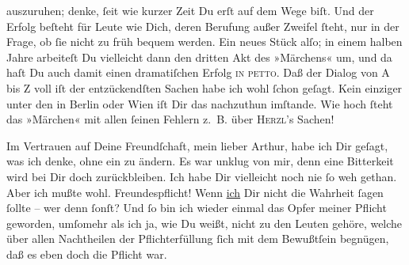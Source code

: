                auszuruhen; denke, ſeit wie kurzer Zeit Du erſt auf dem Wege biſt. Und der Erfolg
               beſteht für Leute wie Dich, deren Berufung außer Zweifel ſteht, nur in der Frage, ob
               ſie nicht zu früh bequem werden. Ein neues Stück alſo; in einem halben Jahre arbeiteſt Du vielleicht
               dann den dritten Akt des »Märchens« um, und da haſt Du auch  damit einen dramatiſchen Erfolg \textsc{in petto}. Daß der
               Dialog von \textsc{A} bis \textsc{Z} voll iſt der
               entzückendſten Sachen habe ich \strikeout{\textcolor{gray}{×}} wohl ſchon geſagt. Kein einziger unter den \label{K_L02674-8v}\label{K_L02674-8} in Berlin oder Wien iſt Dir das {\pb}nachzuthun imſtande. Wie hoch ſteht das »Märchen« mit allen ſeinen Fehlern z. B. über \textsc{Herzl}’s Sachen! {\dotsfour}\pend
           
\pstart
           Im Vertrauen auf Deine Freundſchaft, mein lieber Arthur, habe ich Dir geſagt, was ich
               denke, ohne ein \label{K_L02674-9v}\label{K_L02674-9} zu ändern. Es war unklug von mir, denn eine
               Bitterkeit wird bei Dir doch zurückbleiben. Ich habe Dir vielleicht noch nie ſo weh
               gethan. Aber ich mußte wohl. Freundespflicht! Wenn \uline{ich} Dir nicht die Wahrheit ſagen ſollte – wer  denn ſonſt? Und ſo bin ich wieder einmal das Opfer meiner Pflicht geworden,
               umſomehr als ich ja, wie Du weißt, nicht zu den Leuten gehöre, welche über allen
               Nachtheilen der Pflichterfüllung ſich mit dem Bewußtſein begnügen, daß es eben doch
               die Pflicht war.\pend
           
